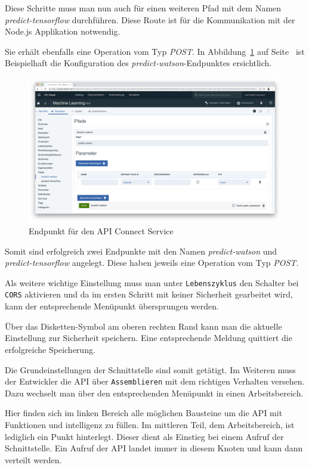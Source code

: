 Diese Schritte muss man nun auch für einen weiteren Pfad mit dem Namen \textit{predict-tensorflow} durchführen. Diese
Route ist für die Kommunikation mit der Node.js Applikation notwendig.

Sie erhält ebenfalls eine Operation vom Typ \textit{POST}. In Abbildung~\ref{fig:umsetzung_apiconnect_endpoint} auf
Seite~\pageref{fig:umsetzung_apiconnect_endpoint} ist Beispielhaft die Konfiguration des
\textit{predict-watson}-Endpunktes ersichtlich.

\begin{figure}[h]
    \centering
    \includegraphics[width=\textwidth]{images/kapitel_3/apiconnect_endpoint.png}
    \caption{Endpunkt für den API Connect Service}
    \label{fig:umsetzung_apiconnect_endpoint}
\end{figure}

Somit sind erfolgreich zwei Endpunkte mit den Namen \textit{predict-watson} und \textit{predict-tensorflow} angelegt.
Diese haben jeweils eine Operation vom Typ \textit{POST}.

Als weitere wichtige Einstellung muss man unter \texttt{Lebenszyklus} den Schalter bei \texttt{CORS} aktivieren und da
im ersten Schritt mit keiner Sicherheit gearbeitet wird, kann der entsprechende Menüpunkt übersprungen werden.

Über das Disketten-Symbol am oberen rechten Rand kann man die aktuelle Einstellung zur Sicherheit speichern. Eine
entsprechende Meldung quittiert die erfolgreiche Speicherung.

Die Grundeinstellungen der Schnittstelle sind somit getätigt. Im Weiteren muss der Entwickler die API über
\texttt{Assemblieren} mit dem richtigen Verhalten versehen. Dazu wechselt man über den entsprechenden Menüpunkt in einen
Arbeitsbereich.

Hier finden sich im linken Bereich alle möglichen Bausteine um die API mit Funktionen und intelligenz zu füllen. Im
mittleren Teil, dem Arbeitsbereich, ist lediglich ein Punkt hinterlegt. Dieser dient als Einstieg bei einem Aufruf der
Schnittstelle. Ein Aufruf der API landet immer in diesem Knoten und kann dann verteilt werden.

